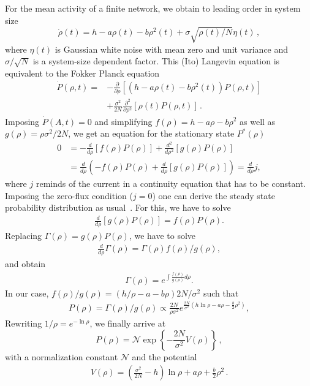 For the mean activity of a finite network, we obtain to leading order in system size
\begin{equation}\label{si_eq:MF_noise}
    \dot{\rho}(t) = h - a\rho(t) -b\rho^2(t) + \sigma\sqrt{\rho(t)/N}\eta(t)\, ,
\end{equation}
where $\eta(t)$ is Gaussian white noise with mean zero and unit variance and $\sigma/\sqrt{N}$ is a system-size dependent factor.
This (Ito) Langevin equation is equivalent to the Fokker Planck equation
\begin{align}\label{si_eq:FP_noise}
    \dot{P}(\rho,t) = &-\frac{\partial}{\partial\rho}\left[\left(h-a\rho(t)-b\rho^2(t)\right)P(\rho,t)\right]\nonumber\\
                    &+\frac{\sigma^2}{2N}\frac{\partial^2}{\partial\rho^2}\left[\rho(t)P(\rho,t)\right]\, .
\end{align}
Imposing $\dot{P}(A,t)=0$ and simplifying $f(\rho)=h-a\rho-b\rho^2$ as well as $g(\rho)=\rho\sigma^2/2N$, we get an equation for the stationary state $P^\ast(\rho)$
\begin{align}
    0
    &= -\frac{d}{d\rho}\left[f(\rho)P(\rho)\right] + \frac{d^2}{d\rho^2}\left[g(\rho)P(\rho)\right]\\
    &= \frac{d}{d\rho}\left(-f(\rho)P(\rho) +  \frac{d}{d\rho}\left[g(\rho)P(\rho)\right]\right) = \frac{d}{d\rho} j,
\end{align}
where $j$ reminds of the current in a continuity equation that has to be constant.
Imposing the zero-flux condition ($j=0$) one can derive the steady state probability distribution as usual~\cite{gardiner_handbook_1985}.
For this, we have to solve
\begin{align}
 \frac{d}{d\rho}\left[g(\rho)P(\rho)\right] = f(\rho)P(\rho).
\end{align}
Replacing $\Gamma(\rho)=g(\rho)P(\rho)$, we have to solve
\begin{align}
    \frac{d}{d\rho}\Gamma(\rho) = \Gamma(\rho)f(\rho)/g(\rho),
\end{align}
and obtain
\begin{align}
    \Gamma(\rho) = e^{\int \frac{f(\rho)}{g(\rho)}d\rho}.
\end{align}
In our case, $f(\rho)/g(\rho)= \left(h/\rho -a -b\rho\right)2N/\sigma^2$ such that
\begin{align}
    P(\rho) = \Gamma(\rho)/g(\rho) \propto \frac{2N}{\rho\sigma^2}e^{\frac{2N}{\sigma^2}\left(h\ln\rho-a\rho-\frac{b}{2}\rho^2\right)},
\end{align}
Rewriting $1/\rho=e^{-\ln{\rho}}$, we finally arrive at
\begin{equation}
    P(\rho) = \mathcal{N}\exp\left\{-\frac{2N}{\sigma^2}V(\rho)\right\}\, ,
\end{equation}
with a normalization constant $\mathcal{N}$ and the potential
\begin{align}
    V(\rho) = \left(\frac{\sigma^2}{2N}-h\right)\ln\rho + a\rho + \frac{b}{2}\rho^2\, .
\end{align}
